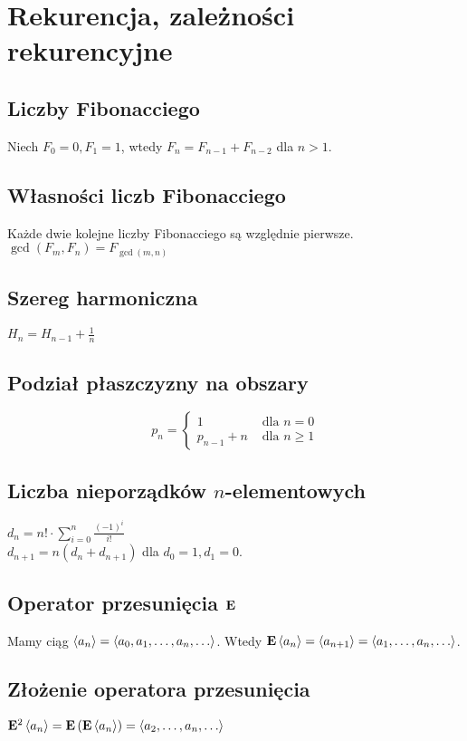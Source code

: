 \section{Rekurencja, zależności rekurencyjne}

\subsection*{Liczby Fibonacciego}
Niech $F_0 = 0, F_1 = 1$, wtedy $F_n = F_{n-1} + F_{n-2}$ dla $n > 1$. 

\subsection*{Własności liczb Fibonacciego}
Każde dwie kolejne liczby Fibonacciego są względnie pierwsze. \\
$\gcd(F_m, F_n) = F_{\gcd(m, n)}$

\subsection*{Szereg harmoniczna}
$H_n = H_{n-1} + \frac{1}{n}$

\subsection*{Podział płaszczyzny na obszary}
$$
p_n =
\begin{cases}
    1 &\text{ dla } n = 0 \\
    p_{n-1} + n &\text{ dla } n \geq 1 
\end{cases}
$$

\subsection*{Liczba nieporządków $n$-elementowych}
$d_n = n! \cdot \sum\limits_{i=0}^{n} \frac{(-1)^i}{i!}$ \\
$d_{n+1} = n(d_n + d_{n+1})$ dla $d_0 = 1, d_1 = 0$.

\subsection*{Operator przesunięcia $\mathbf{E}$}
Mamy ciąg $\left\langle a_n \right\rangle = \left\langle a_0, a_1, \ldots, a_n, \ldots \right\rangle$. Wtedy
$\mathbf{E} \left\langle a_n \right\rangle = \left\langle a_{n+1} \right\rangle = \left\langle a_1, \ldots, a_n, \ldots \right\rangle$.

\subsection*{Złożenie operatora przesunięcia}
$\mathbf{E}^2 \left\langle a_n \right\rangle = \mathbf{E} \left( \mathbf{E} \left\langle a_n \right\rangle \right)
= \left\langle a_2, \ldots, a_n, \ldots \right\rangle$

